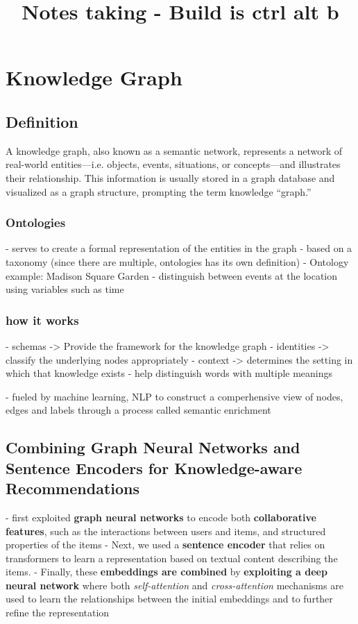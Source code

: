 \documentclass{report}
\title{Notes taking - Build is ctrl alt b}
\begin{document}
\maketitle
\chapter{Knowledge Graph}

\section{Definition}

A knowledge graph, also known as a semantic network, represents a network of real-world entities—i.e. objects, events, situations, or concepts—and illustrates their relationship. This information is usually stored in a graph database and visualized as a graph structure, prompting the term knowledge “graph.”

\subsection{Ontologies}
- serves to create a formal representation of the entities in the graph
- based on a taxonomy (since there are multiple, ontologies has its own definition)
- Ontology example: Madison Square Garden
    - distinguish between events at the location using variables such as time

\subsection{how it works}
- schemas -> Provide the framework for the knowledge graph
- identities -> classify the underlying nodes appropriately
- context -> determines the setting in which that knowledge exists
    - help distinguish words with multiple meanings

- fueled by machine learning, NLP to construct a comperhensive view of nodes, edges and labels through a process called semantic enrichment



\section{Combining Graph Neural Networks and Sentence Encoders for
Knowledge-aware Recommendations}
- first exploited\textbf{ graph neural networks} to encode both \textbf{collaborative features}, such as the interactions between users and items, and structured properties of the items
- Next, we used a\textbf{ sentence encoder} that relies on transformers to learn a representation based on textual content describing the items. 
- Finally, these \textbf{embeddings are combined }by \textbf{exploiting a deep neural network }where both \textit{self-attention }and\textit{ cross-attention} mechanisms are used to learn the
relationships between the initial embeddings and to further refine
the representation
\end{document}
